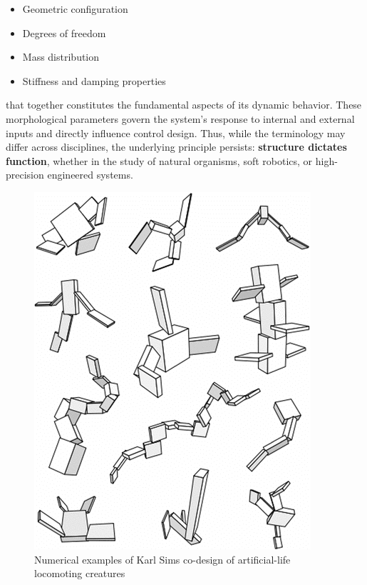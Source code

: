 \begin{itemize}
  \item Geometric configuration
  \item Degrees of freedom
  \item Mass distribution
  \item Stiffness and damping properties
\end{itemize}

\noindent that together constitutes the fundamental aspects of its
dynamic behavior. These morphological parameters govern the system's
response to internal and external inputs and directly influence control
design. Thus, while the terminology may differ across disciplines, the
underlying principle persists: \textbf{structure dictates function},
whether in the study of natural organisms, soft robotics, or
high-precision engineered systems.

\begin{figure}[!t]
  \includegraphics[width=\columnwidth]{./img/sims.png}
  \caption{Numerical examples of Karl Sims co-design of artificial-life locomoting creatures}
\end{figure}

